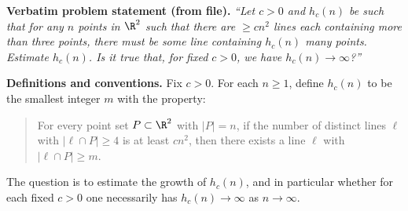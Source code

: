 \noindent\textbf{Verbatim problem statement (from file).}
\emph{``Let $c>0$ and $h_c(n)$ be such that for any $n$ points in $\R^2$ such that there are $\ge cn^2$ lines each containing more than three points, there must be some line containing $h_c(n)$ many points. Estimate $h_c(n)$. Is it true that, for fixed $c>0$, we have $h_c(n)\to\infty$?''}

\medskip
\noindent\textbf{Definitions and conventions.}
Fix $c>0$.
For each $n\ge 1$, define $h_c(n)$ to be the smallest integer $m$ with the property:
\begin{quote}
For every point set $P\subset\R^2$ with $|P|=n$, if the number of distinct lines $\ell$ with $|\ell\cap P|\ge 4$ is at least $c n^2$, then there exists a line $\ell$ with $|\ell\cap P|\ge m$.
\end{quote}
The question is to estimate the growth of $h_c(n)$, and in particular whether for each fixed $c>0$ one necessarily has $h_c(n)\to\infty$ as $n\to\infty$.
